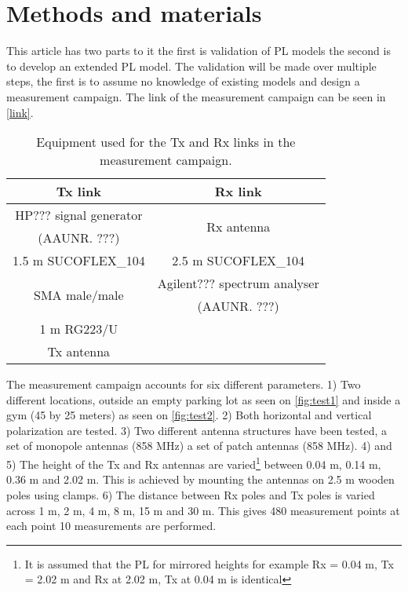 
\section{Methods and materials}


This article has two parts to it the first is validation of PL models the second is to develop an extended PL model. The validation will be made over multiple steps, the first is to assume no knowledge of existing models and design a measurement campaign. The link of the measurement campaign can be seen in \autoref{link}. 

\begin{table}[!htbp]
\centering
\begin{tabular}{|c|c|}\hline
\textbf{Tx link}&\textbf{Rx link}\\\hline
HP??? signal generator  & \multirow{2}{*}{Rx antenna} \\
(AAUNR. ???)& \\\hline
1.5 m SUCOFLEX\_104 & 2.5 m SUCOFLEX\_104 \\\hline 
\multirow{2}{*}{SMA male/male} & Agilent??? spectrum analyser \\
&(AAUNR. ???)\\\hline
1 m RG223/U & \\\hline
Tx antenna &\\\hline
\end{tabular}
\caption{Equipment used for the Tx and Rx links in the measurement campaign.}
\label{link}
\end{table}
The measurement campaign accounts for six different parameters. 1) Two different locations, outside an empty parking lot as seen on \autoref{fig:test1} and inside a gym (45 by 25 meters) as seen on \autoref{fig:test2}. 2) Both horizontal and vertical polarization are tested. 3) Two different antenna structures have been tested, a set of monopole antennas (858 MHz) a set of patch antennas (858 MHz). 4) and 5) The height of the Tx and Rx antennas are varied\footnote{It is assumed that the PL for mirrored heights for example Rx = 0.04 m, Tx = 2.02 m and Rx at 2.02 m, Tx at 0.04 m is identical} between 0.04 m, 0.14 m, 0.36 m and 2.02 m. This is achieved by mounting the antennas on 2.5 m wooden poles using clamps. 6) The distance between Rx poles and Tx poles is varied across 1 m, 2 m, 4 m, 8 m, 15 m and 30 m. This gives 480 measurement points at each point 10 measurements are performed.

